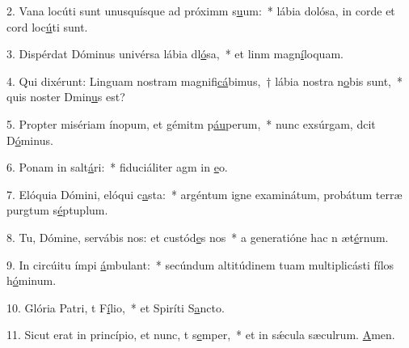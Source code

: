 2. Vana locúti sunt unusquísque ad próximm s\uline{u}um:~* lábia dolósa, in corde et cord loc\uline{ú}ti sunt.\par 
3. Dispérdat Dóminus univérsa lábia dl\uline{ó}sa,~* et linm magn\uline{í}loquam.\par 
4. Qui dixérunt: Linguam nostram magnifi\uline{cá}bimus,~† lábia nostra  n\uline{o}bis sunt,~* quis noster Dmin\uline{u}s est?\par 
5. Propter misériam ínopum, et gémitm p\uline{áu}perum,~* nunc exsúrgam, dcit D\uline{ó}minus.\par 
6. Ponam in salt\uline{á}ri:~* fiduciáliter agm in \uline{e}o.\par 
7. Elóquia Dómini, elóqui c\uline{a}sta:~* argéntum igne examinátum, probátum terræ purgtum s\uline{é}ptuplum.\par 
8. Tu, Dómine, servábis nos: et custód\uline{e}s nos~* a generatióne hac n æt\uline{é}rnum.\par 
9. In circúitu ímpi \uline{á}mbulant:~* secúndum altitúdinem tuam multiplicásti fílos h\uline{ó}minum.\par 
10. Glória Patri, t F\uline{í}lio,~* et Spiríti S\uline{a}ncto.\par 
11. Sicut erat in princípio, et nunc, t s\uline{e}mper,~* et in sǽcula sæculrum. \uline{A}men.\par 
